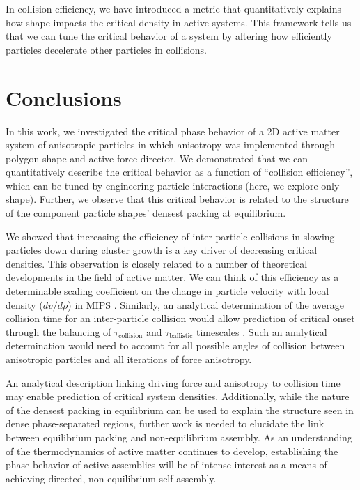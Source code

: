 In collision efficiency, we have introduced a metric that quantitatively explains how shape impacts the  critical density in active systems.
This framework tells us that we can tune the critical behavior of a system by altering how efficiently particles decelerate other particles in collisions.


\section{Conclusions}

In this work, we investigated the critical phase behavior of a 2D active matter system of anisotropic particles in which anisotropy was implemented through polygon shape and active force director.
We demonstrated that we can quantitatively describe the critical behavior as a function of ``collision efficiency'', which can be tuned by engineering particle interactions (here, we explore only shape).
Further, we observe that this critical behavior is related to the structure of the component particle shapes' densest packing at equilibrium.

We showed that increasing the efficiency of inter-particle collisions in slowing particles down during cluster growth is a key driver of decreasing critical densities.
This observation is closely related to a number of theoretical developments in the field of active matter.
We can think of this efficiency as a determinable scaling coefficient on the change in particle velocity with local density (${dv}/{d\rho}$) in MIPS \cite{Cates_2010_PNAS}.
Similarly, an analytical determination of the average collision time for an inter-particle collision would allow prediction of critical onset through the balancing of $\tau_\text{collision}$ and $\tau_\text{ballistic}$ timescales \cite{Bruss_2018_PRE}.
Such an analytical determination would need to account for all possible angles of collision between anisotropic particles and all iterations of force anisotropy.

An analytical description linking driving force and anisotropy to collision time may enable prediction of critical system densities.
Additionally, while the nature of the densest packing in equilibrium can be used to explain the structure seen in dense phase-separated regions, further work is needed to elucidate the link between equilibrium packing and non-equilibrium assembly.
As an understanding of the thermodynamics of active matter continues to develop, establishing the phase behavior of active assemblies will be of intense interest as a means of achieving directed, non-equilibrium self-assembly.


